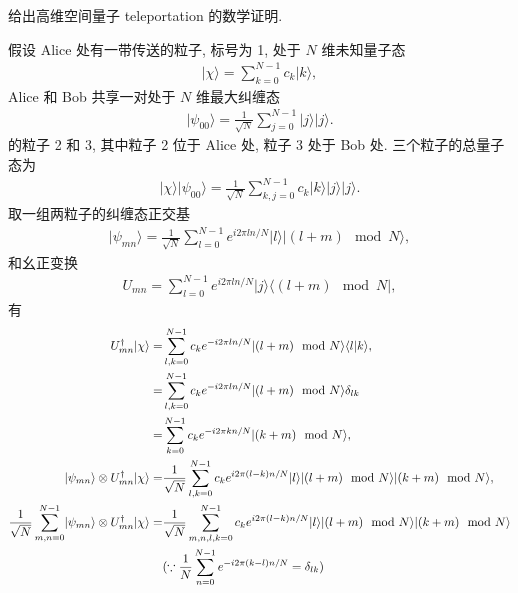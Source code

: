 \documentclass{assignment}
\begin{document}
\begin{prob}
    给出高维空间量子 teleportation 的数学证明.
\end{prob}
\begin{pf}
    假设 Alice 处有一带传送的粒子, 标号为 1, 处于 $N$ 维未知量子态
    \begin{align}
        \lvert\chi\rangle=\sum_{k=0}^{N-1}c_k\lvert k\rangle,
    \end{align}
    Alice 和 Bob 共享一对处于 $N$ 维最大纠缠态
    \begin{align}
        \lvert\psi_{00}\rangle=\frac{1}{\sqrt{N}}\sum_{j=0}^{N-1}\lvert j\rangle\lvert j\rangle.
    \end{align}
    的粒子 2 和 3, 其中粒子 2 位于 Alice 处, 粒子 3 处于 Bob 处.
    三个粒子的总量子态为
    \begin{align}
        \lvert\chi\rangle\lvert\psi_{00}\rangle=\frac{1}{\sqrt{N}}\sum_{k,j=0}^{N-1}c_k\lvert k\rangle\lvert j\rangle\lvert j\rangle.
    \end{align}
    取一组两粒子的纠缠态正交基
    \begin{align}
        \lvert\psi_{mn}\rangle=\frac{1}{\sqrt{N}}\sum_{l=0}^{N-1}e^{i2\pi ln/N}\lvert l\rangle\lvert(l+m)\mod N\rangle,
    \end{align}
    和幺正变换
    \begin{align}
        U_{mn}=\sum_{l=0}^{N-1}e^{i2\pi ln/N}\lvert j\rangle\langle(l+m)\mod N\rvert,
    \end{align}
    有
    \begin{align}
        \notag U_{mn}^{\dagger}\lvert\chi\rangle=&\sum_{l,k=0}^{N-1}c_ke^{-i2\pi ln/N}\lvert(l+m)\mod N\rangle\langle l\vert k\rangle,\\
        \notag=&\sum_{l,k=0}^{N-1}c_ke^{-i2\pi ln/N}\lvert(l+m)\mod N\rangle\delta_{lk}\\
        =&\sum_{k=0}^{N-1}c_ke^{-i2\pi kn/N}\lvert(k+m)\mod N\rangle,\\
        \lvert\psi_{mn}\rangle\otimes U_{mn}^{\dagger}\lvert\chi\rangle=&\frac{1}{\sqrt{N}}\sum_{l,k=0}^{N-1}c_ke^{i2\pi(l-k)n/N}\lvert l\rangle\lvert(l+m)\mod N\rangle\lvert(k+m)\mod N\rangle,\\
        \notag\frac{1}{\sqrt{N}}\sum_{m,n=0}^{N-1}\lvert\psi_{mn}\rangle\otimes U_{mn}^{\dagger}\lvert\chi\rangle=&\frac{1}{\sqrt{N}}\sum_{m,n,l,k=0}^{N-1}c_ke^{i2\pi(l-k)n/N}\lvert l\rangle\lvert(l+m)\mod N\rangle\lvert(k+m)\mod N\rangle\\
        \notag&(\because\frac{1}{N}\sum_{n=0}^{N-1}e^{-i2\pi(k-l)n/N}=\delta_{lk})\\

\end{align}
\end{pf}
\end{document}
